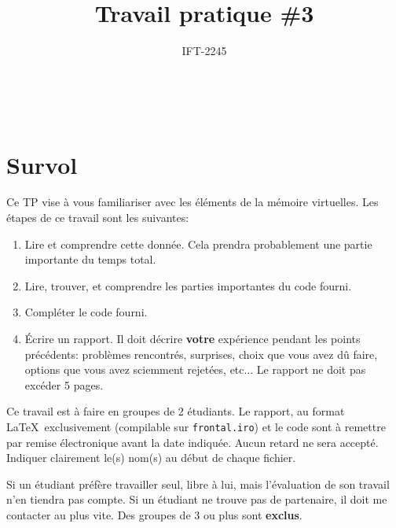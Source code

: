 \documentclass{article}
\title{Travail pratique \#3}
\author{IFT-2245}
\begin{document}
\maketitle

{\centering {} \\}

\newcommand \mML {\ensuremath\mu\textsl{ML}}
\newcommand \kw [1] {\textsf{#1}}
\newcommand \id [1] {\textsl{#1}}
\newcommand \punc [1] {\kw{`#1'}}
\newcommand \str [1] {\texttt{"#1"}}
\newenvironment{outitemize}{
  \begin{itemize}
  \let \origitem \item \def \item {\origitem[]\hspace{-18pt}}
}{
  \end{itemize}
}
\newcommand \Align [2][t] {
  \begin{array}[#1]{@{}l}
    #2
  \end{array}}

\section{Survol}

Ce TP vise à vous familiariser avec les éléments de la mémoire virtuelles.
Les étapes de ce travail sont les suivantes:
\begin{enumerate}
\item Lire et comprendre cette donnée.  Cela prendra probablement une partie
  importante du temps total.
\item Lire, trouver, et comprendre les parties importantes du code fourni.
\item Compléter le code fourni.
\item Écrire un rapport.  Il doit décrire \textbf{votre} expérience pendant
  les points précédents: problèmes rencontrés, surprises, choix que vous
  avez dû faire, options que vous avez sciemment rejetées, etc...  Le
  rapport ne doit pas excéder 5 pages.
\end{enumerate}

Ce travail est à faire en groupes de 2 étudiants.  Le rapport, au format
\LaTeX\ exclusivement (compilable sur \texttt{frontal.iro}) et le code sont
à remettre par remise électronique avant la date indiquée.  Aucun retard ne
sera accepté.  Indiquer clairement le(s) nom(s) au début de chaque fichier.

Si un étudiant préfère travailler seul, libre à lui, mais l'évaluation de
son travail n'en tiendra pas compte.  Si un étudiant ne trouve pas de
partenaire, il doit me contacter au plus vite.  Des groupes de 3 ou plus
sont \textbf{exclus}.
\end{document}
